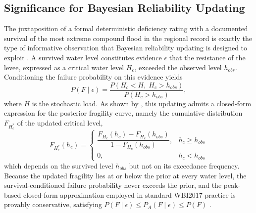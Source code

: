 \subsection{Significance for Bayesian Reliability Updating}
\label{subsec: Significance for Bayesian Reliability Updating}

The juxtaposition of a formal deterministic deficiency rating \parencite{oyo_1999} with a documented survival of the most extreme compound flood in the regional record \parencite{tokachi_levee_committee_2017} is exactly the type of informative observation that Bayesian reliability updating is designed to exploit \parencite{schweckendiek_2014, hkv_2023}. A survived water level constitutes evidence $\epsilon$ that the resistance of the levee, expressed as a critical water level $H_c$, exceeded the observed level $h_{obs}$. Conditioning the failure probability on this evidence yields
\begin{equation}
P(F \mid \epsilon) = \frac{P\!\left(H_c < H,\; H_c > h_{obs}\right)}{P\!\left(H_c > h_{obs}\right)},
\end{equation}
where $H$ is the stochastic load. As shown by \textcite{hkv_2023}, this updating admits a closed-form expression for the posterior fragility curve, namely the cumulative distribution $F_{H_c^{*}}$ of the updated critical level,
\begin{equation}
F_{H_c^{*}}(h_c) =
\begin{cases}
\dfrac{F_{H_c}(h_c) - F_{H_c}(h_{obs})}{1 - F_{H_c}(h_{obs})}, & h_c \geq h_{obs}\\[8pt]
0, & h_c < h_{obs}
\end{cases}
\end{equation}
which depends on the survived level $h_{obs}$ but not on its exceedance frequency. Because the updated fragility lies at or below the prior at every water level, the survival-conditioned failure probability never exceeds the prior, and the peak-based closed-form approximation employed in standard WBI2017 practice is provably conservative, satisfying $P(F \mid \epsilon) \leq P_A(F \mid \epsilon) \leq P(F)$ \parencite{hkv_2023, schweckendiek_2016}.

